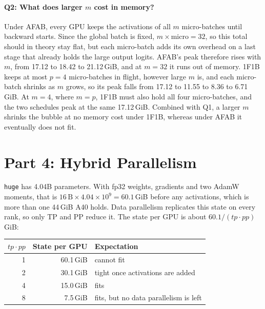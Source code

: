 \documentclass[10pt]{article}
\begin{document}
\paragraph{Q2: What does larger $m$ cost in memory?}
Under AFAB, every GPU keeps the activations of all $m$ micro-batches until
backward starts. Since the global batch is fixed, $m \times \text{micro} = 32$,
so this total should in theory stay flat, but each micro-batch adds its own
overhead on a last stage that already holds the large output logits. AFAB's
peak therefore rises with $m$, from 17.12 to 18.42 to 21.12\,GiB, and at $m=32$ it runs out
of memory.
1F1B keeps at most $p=4$ micro-batches in flight, however large $m$ is, and
each micro-batch shrinks as $m$ grows, so its peak falls from 17.12 to 11.55 to 8.36 to 6.71\,GiB.
At $m=4$, where $m=p$, 1F1B must also hold all four micro-batches, and the two
schedules peak at the same 17.12\,GiB. Combined with Q1, a larger $m$
shrinks the bubble at no memory cost under 1F1B, whereas under AFAB it
eventually does not fit.

\section{Part 4: Hybrid Parallelism}

\texttt{huge} has 4.04B parameters. With fp32 weights, gradients and two
AdamW moments, that is $16\,\text{B} \times 4.04\times10^9 = 60.1$\,GiB
before any activations, which is more than one 44\,GiB A40 holds. Data
parallelism replicates this state on every rank, so only TP and PP
reduce it. The state per GPU is about $60.1/(tp \cdot pp)$\,GiB:

\begin{center}
\begin{tabular}{rrl}
\toprule
$tp \cdot pp$ & State per GPU & Expectation \\
\midrule
1 & 60.1\,GiB & cannot fit \\
2 & 30.1\,GiB & tight once activations are added \\
4 & 15.0\,GiB & fits \\
8 & 7.5\,GiB  & fits, but no data parallelism is left \\
\bottomrule
\end{tabular}
\end{center}
\end{document}
